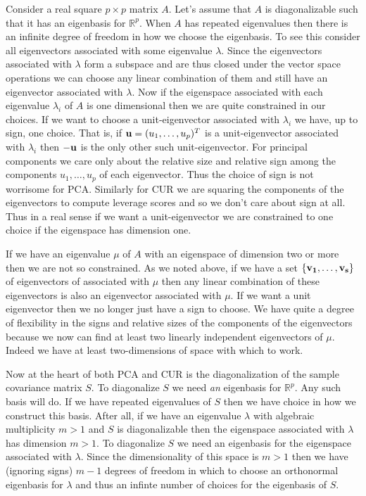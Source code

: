 \documentclass{book}
\begin{document}
Consider a real square $p \times p$ matrix $A$. Let's assume that $A$ is diagonalizable such that it has an eigenbasis for $\mathbb{R}^p$. When $A$ has repeated eigenvalues then there is an infinite degree of freedom in how we choose the eigenbasis. To see this consider all eigenvectors associated with some eigenvalue $\lambda$. Since the eigenvectors associated with $\lambda$ form a subspace and are thus closed under the vector space operations we can choose any linear combination of them and still have an eigenvector associated with $\lambda$. Now if the eigenspace associated with each eigenvalue $\lambda_i$ of $A$ is one dimensional then we are quite constrained in our choices. If we want to choose a unit-eigenvector associated with $\lambda_i$ we have, up to sign, one choice. That is, if ${\bf u}=(u_1,\ldots,u_p)^T$ is a unit-eigenvector associated with $\lambda_i$ then $-{\bf u}$ is the only other such unit-eigenvector. For principal components we care only about the relative size and relative sign among the components $u_1,\ldots,u_p$ of each eigenvector. Thus the choice of sign is not worrisome for PCA. Similarly for CUR we are squaring the components of the eigenvectors to compute leverage scores and so we don't care about sign at all. Thus in a real sense if we want a unit-eigenvector we are constrained to one choice if the eigenspace has dimension one.

If we have an eigenvalue $\mu$ of $A$ with an eigenspace of dimension two or more then we are not so constrained. As we noted above, if we have a set $\{{\bf v_1},\ldots,{\bf v_s}\}$ of eigenvectors of associated with $\mu$ then any linear combination of these eigenvectors is also an eigenvector associated with $\mu$. If we want a unit eigenvector then we no longer just have a sign to choose. We have quite a degree of flexibility in the signs and relative sizes of the components of the eigenvectors because we now can find at least two linearly independent eigenvectors of $\mu$. Indeed we have at least two-dimensions of space with which to work. 

Now at the heart of both PCA and CUR is the diagonalization of the sample covariance matrix $S$. To diagonalize $S$ we need \emph{an} eigenbasis for $\mathbb{R}^p$. Any such basis will do. If we have repeated eigenvalues of $S$ then we have choice in how we construct this basis. After all, if we have an eigenvalue $\lambda$ with algebraic multiplicity $m> 1$ and $S$ is diagonalizable then the eigenspace associated with $\lambda$ has dimension $m>1$. To diagonalize $S$ we need an eigenbasis for the eigenspace associated with $\lambda$. Since the dimensionality of this space is $m> 1$ then we have (ignoring signs) $m-1$ degrees of freedom in which to choose an orthonormal eigenbasis for $\lambda$ and thus an infinte number of choices for the eigenbasis of $S$. 
\end{document}
